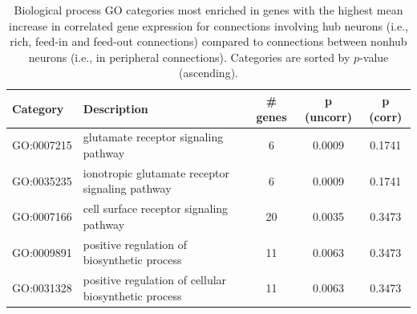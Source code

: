 \documentclass[10pt,letterpaper]{article}
\begin{document}
{\begin{table}[]
\begin{adjustwidth}{-2.25in}{}
\centering
\caption{
Biological process GO categories most enriched in genes with the highest mean increase in correlated gene expression for connections involving hub neurons (i.e., rich, feed-in and feed-out connections) compared to connections between nonhub neurons (i.e., in peripheral connections).
Categories are sorted by $p$-value (ascending).
}
\label{tab:enrichmentRICH}
\begin{tabular}{llccc}
\hline
\textbf{Category} & \textbf{Description}                                                                                               &  \textbf{\# genes} & \textbf{p (uncorr)}                                                                                                                                      & \textbf{p (corr)} \\ \hline                                                                                                                                        
GO:0007215          & glutamate receptor signaling pathway                                                                               & 6                                                      & 0.0009                                               & 0.1741                                             \\
GO:0035235          & ionotropic glutamate receptor signaling pathway                        & 6                                                      & 0.0009                                               & 0.1741                                             \\
GO:0007166          & cell surface receptor signaling pathway                                                                            & 20                                                     & 0.0035                                               & 0.3473                                             \\
GO:0009891          & positive regulation of biosynthetic process                                                                        & 11                                                     & 0.0063                                               & 0.3473                                             \\
GO:0031328          & positive regulation of cellular biosynthetic process                   & 11                                                     & 0.0063                                               & 0.3473                                             \\

\end{tabular}
\end{adjustwidth}
\end{table}}
\end{document}

